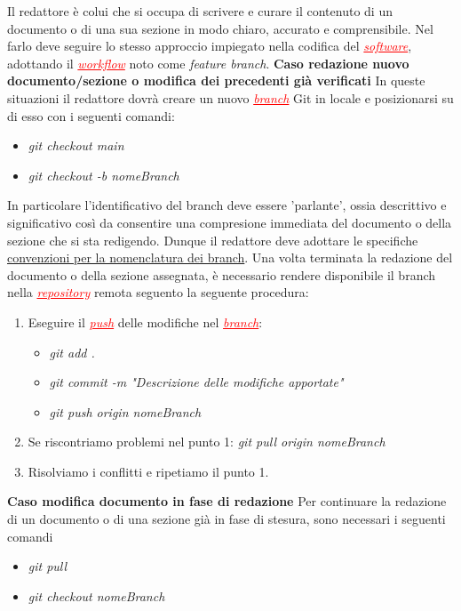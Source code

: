 Il redattore è colui che si occupa di scrivere e curare il contenuto di un documento o di una sua sezione in modo chiaro, accurato e comprensibile.
Nel farlo deve seguire lo stesso approccio impiegato nella codifica del \textcolor{red}{\uline{\textit{software}}}, adottando il
\textcolor{red}{\uline{\textit{workflow}}} noto come \textit{feature branch}.
\textbf{Caso redazione nuovo documento/sezione o modifica dei precedenti già verificati}
In queste situazioni il redattore dovrà creare un nuovo \textcolor{red}{\uline{\textit{branch}}} Git in locale e posizionarsi su di esso con i seguenti comandi:
\begin{itemize}
    \item \textit{git checkout main}
    \item \textit{git checkout -b nomeBranch}
\end{itemize}
In particolare l'identificativo del branch deve essere 'parlante', ossia descrittivo e significativo così da consentire una compresione immediata
del documento o della sezione che si sta redigendo. Dunque il redattore deve adottare le specifiche 
\href{#convenzioni_nomenclatura}{convenzioni per la nomenclatura dei branch}.
Una volta terminata la redazione del documento o della sezione assegnata, è necessario rendere disponibile il branch
nella \textcolor{red}{\uline{\textit{repository}}} remota seguento la seguente procedura:
\begin{enumerate}
    \item Eseguire il \textcolor{red}{\uline{\textit{push}}} delle modifiche nel \textcolor{red}{\uline{\textit{branch}}}:
    \begin{itemize}
        \item \textit{git add .}
        \item \textit{git commit -m "Descrizione delle modifiche apportate"}
        \item \textit{git push origin nomeBranch}
    \end{itemize}
    \item Se riscontriamo problemi nel punto 1:
    \textit{git pull origin nomeBranch}
    \item Risolviamo i conflitti e ripetiamo il punto 1.
\end{enumerate}
\textbf{Caso modifica documento in fase di redazione}
Per continuare la redazione di un documento o di una sezione già in fase di stesura, sono necessari i seguenti comandi
\begin{itemize}
    \item \textit{git pull}
    \item \textit{git checkout nomeBranch}
\end{itemize}
